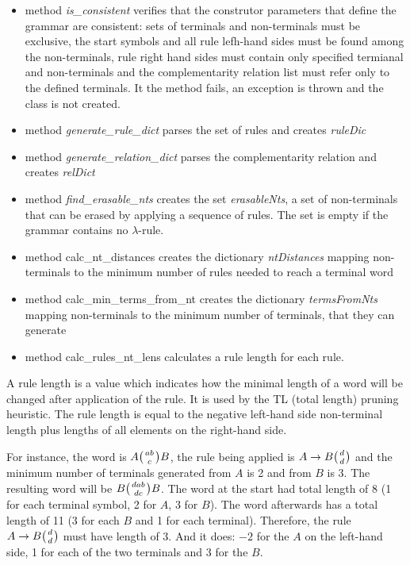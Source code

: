 \begin{itemize}
  \item{method \textit{is\_consistent} verifies that the construtor parameters that define the grammar are consistent: sets of terminals and non-terminals must be exclusive, the start symbols and all rule lefh-hand sides must be found among the non-terminals, rule right hand sides must contain only specified termianal and non-terminals and the complementarity relation list must refer only to the defined terminals. It the method fails, an exception is thrown and the class is not created.}
  \item{method \textit{generate\_rule\_dict} parses the set of rules and creates \textit{ruleDic}}
  \item{method \textit{generate\_relation\_dict} parses the complementarity relation and creates \textit{relDict}}
  \item{method \textit{find\_erasable\_nts} creates the set \textit{erasableNts}, a set of non-terminals that can be erased by applying a sequence of rules. The set is empty if the grammar contains no $\lambda$-rule.}
  \item{method calc\_nt\_distances creates the dictionary \textit{ntDistances} mapping non-terminals to the minimum number of rules needed to reach a terminal word}
  \item{method calc\_min\_terms\_from\_nt creates the dictionary \textit{termsFromNts} mapping non-terminals to the minimum number of terminals, that they can generate}
  \item{method calc\_rules\_nt\_lens calculates a rule length for each rule.}
\end{itemize}

A rule length is a value which indicates how the minimal length of a word will be changed after application of the rule. It is used by the TL (total length) pruning heuristic. The rule length is equal to the negative left-hand side non-terminal length plus lengths of all elements on the right-hand side.

For instance, the word is $A \wkpair{ab}{c} B$, the rule being applied is $A \rightarrow B \wkpair{d}{d}$ and the minimum number of terminals generated from $A$ is 2 and from $B$ is 3. The resulting word will be $B \wkpair{dab}{dc} B$. The word at the start had total length of 8 (1 for each terminal symbol, 2 for $A$, 3 for $B$). The word afterwards has a total length of 11 (3 for each $B$ and 1 for each terminal). Therefore, the rule $A \rightarrow B \wkpair{d}{d}$ must have length of 3. And it does: $-2$ for the $A$ on the left-hand side, 1 for each of the two terminals and 3 for the $B$.

